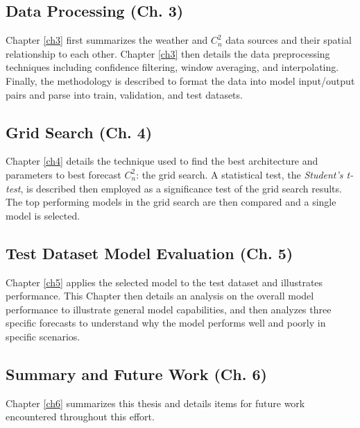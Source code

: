 \subsection{Data Processing (Ch. 3)}
Chapter \ref{ch3} first summarizes the weather and $C_{n}^{2}$ data sources and their spatial relationship to each other. Chapter \ref{ch3} then details the data preprocessing techniques including confidence filtering, window averaging, and interpolating. Finally, the methodology is described to format the data into model input/output pairs and parse into train, validation, and test datasets.

\subsection{Grid Search (Ch. 4)}
Chapter \ref{ch4} details the technique used to find the best architecture and parameters to best forecast $C_{n}^{2}$: the grid search. A statistical test, the \textit{Student's t-test}, is described then employed as a significance test of the grid search results. The top performing models in the grid search are then compared and a single model is selected.

\subsection{Test Dataset Model Evaluation (Ch. 5)}
Chapter \ref{ch5} applies the selected model to the test dataset and illustrates performance. This Chapter then details an analysis on the overall model performance to illustrate general model capabilities, and then analyzes three specific forecasts to understand why the model performs well and poorly in specific scenarios.

\subsection{Summary and Future Work (Ch. 6)}
Chapter \ref{ch6} summarizes this thesis and details items for future work encountered throughout this effort.